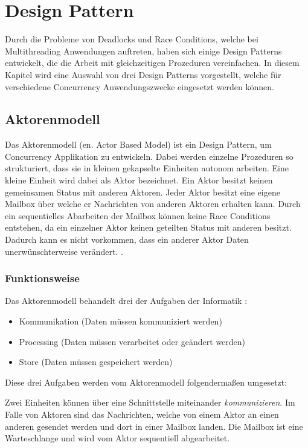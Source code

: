\section{Design Pattern}

Durch die Probleme von Deadlocks und Race Conditions, welche bei Multithreading Anwendungen auftreten, haben sich einige Design Patterns entwickelt, die die Arbeit mit gleichzeitigen Prozeduren vereinfachen. In diesem Kapitel wird eine Auswahl von drei Design Patterns vorgestellt, welche für verschiedene Concurrency Anwendungszwecke eingesetzt werden können.

\subsection{Aktorenmodell}
\label{section:Aktorenmodell}

Das Aktorenmodell (en. Actor Based Model) ist ein Design Pattern, um Concurrency Applikation zu entwickeln. Dabei werden einzelne Prozeduren so strukturiert, dass sie in kleinen gekapselte Einheiten autonom arbeiten. Eine kleine Einheit wird dabei als Aktor bezeichnet. Ein Aktor besitzt keinen gemeinsamen Status mit anderen Aktoren. Jeder Aktor besitzt eine eigene Mailbox über welche er Nachrichten von anderen Aktoren erhalten kann. Durch ein sequentielles Abarbeiten der Mailbox können keine Race Conditions entstehen, da ein einzelner Aktor keinen geteilten Status mit anderen besitzt. Dadurch kann es nicht vorkommen, dass ein anderer Aktor Daten unerwünschterweise verändert.  \cite[p. 84]{Erb2012}. 

\subsubsection{Funktionsweise}

Das Aktorenmodell behandelt drei der Aufgaben der Informatik \cite[p. 85]{Erb2012}:

\begin{itemize}
  \item Kommunikation (Daten müssen kommuniziert werden)
  \item Processing (Daten müssen verarbeitet oder geändert werden)
  \item Store (Daten müssen gespeichert werden)
\end{itemize}

Diese drei Aufgaben werden vom Aktorenmodell folgendermaßen umgesetzt:

Zwei Einheiten können über eine Schnittstelle miteinander \emph{kommunizieren}. Im Falle von Aktoren sind das Nachrichten, welche von einem Aktor an einen anderen gesendet werden und dort in einer Mailbox landen. Die Mailbox ist eine Warteschlange und wird vom Aktor sequentiell abgearbeitet. 

